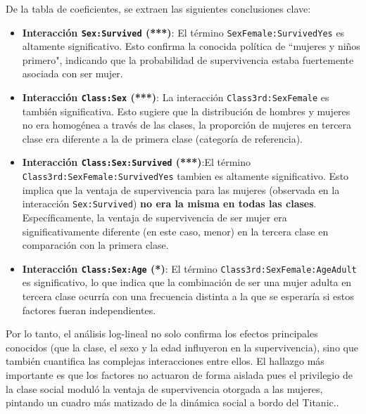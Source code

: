 De la tabla de coeficientes, se extraen las siguientes conclusiones clave:
\begin{itemize}
    \item \textbf{Interacción \texttt{Sex:Survived} (***)}: El término \texttt{SexFemale:SurvivedYes} es altamente significativo. Esto confirma la conocida política de ``mujeres y niños primero", indicando que la probabilidad de supervivencia estaba fuertemente asociada con ser mujer.
    
    \item \textbf{Interacción \texttt{Class:Sex} (***)}: La interacción \texttt{Class3rd:SexFemale} es también significativa. Esto sugiere que la distribución de hombres y mujeres no era homogénea a través de las clases, la proporción de mujeres en tercera clase era diferente a la de primera clase (categoría de referencia).

    \item \textbf{Interacción \texttt{Class:Sex:Survived} (***)}:El término \texttt{Class3rd:SexFemale:SurvivedYes} tambien es altamente significativo. Esto implica que la ventaja de supervivencia para las mujeres (observada en la interacción \texttt{Sex:Survived}) \textbf{no era la misma en todas las clases}. Específicamente, la ventaja de supervivencia de ser mujer era significativamente diferente (en este caso, menor) en la tercera clase en comparación con la primera clase.

    \item \textbf{Interacción \texttt{Class:Sex:Age} (*)}: El término \texttt{Class3rd:SexFemale:AgeAdult} es significativo, lo que indica que la combinación de ser una mujer adulta en tercera clase ocurría con una frecuencia distinta a la que se esperaría si estos factores fueran independientes.
\end{itemize}

\begin{tcolorbox}
Por lo tanto, el análisis log-lineal no solo confirma los efectos principales conocidos (que la clase, el sexo y la edad influyeron en la supervivencia), sino que también cuantifica las complejas interacciones entre ellos. El hallazgo más importante es que los factores no actuaron de forma aislada pues el privilegio de la clase social moduló la ventaja de supervivencia otorgada a las mujeres, pintando un cuadro más matizado de la dinámica social a bordo del Titanic..
\end{tcolorbox}

\newpage

